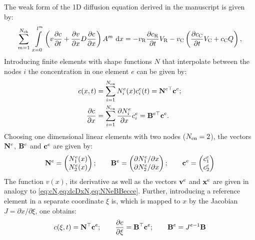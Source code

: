 \documentclass{article}
\begin{document}
  The weak form of the 1D diffusion equation derived in the manuscript is given by:
  \begin{equation}
    \sum_{m=1}^{N_{\rm ch}} \ \int\displaylimits_{x=0}^{l^m} \left( v \frac{\partial c}{\partial t} + \frac{\partial v}{\partial x} D \frac{\partial c}{\partial x} \right) A^m \ {\rm d} x= - v_{\rm R} \frac{\partial c_{\rm R}}{\partial t} V_{\rm R} - v_{\rm C} \left( \frac{\partial c_{\rm C}}{\partial t} V_{\rm C} + c_{\rm C} Q\right), 
    \label{eq:weakForm}
  \end{equation}  
  Introducing finite elements with shape functions $N$ that interpolate between the nodes $i$ the concentration in one element $e$ can be given by:
  \begin{align}
    c(x,t) &= \sum_{i=1}^{N_{\rm en}} N_i^e(x) c_i^e(t) = {{\bf{N}}}^{e \top} {\bf{c}}^e \label{eq:cN};\\
    \frac{\partial c}{\partial x} &= \sum_{i=1}^{N_{\rm en}} \frac{\partial N_i^e}{\partial x} c_i^e= {{\bf{B}}}^{e \top} {\bf{c}}^e.
    \label{eq:dcDxN}
  \end{align}
  Choosing one dimensional linear elements with two nodes ($N_{\rm en}=2$), the vectors ${\bf{N}}^e$, ${\bf{B}}^e$ and ${\bf{c}}^e$ are given by:
  \begin{equation}
    {\bf{N}}^e = \begin{pmatrix} N_1^e(x) \\ N_2^e(x) \end{pmatrix}; \qquad 
    {\bf{B}}^e = \begin{pmatrix} \partial N_1^e / \partial x \\ \partial N_2^e / \partial x \end{pmatrix}; \qquad 
    {\bf{c}}^e = \begin{pmatrix} c_1^e \\ c_2^e \end{pmatrix}
    \label{eq:NNeBBecce}
  \end{equation}
  The function $v(x)$, its derivative as well as the vectors ${\bf{v}}^e$ and ${\bf{x}}^e$ are given in analogy to \cref{eq:cN,eq:dcDxN,eq:NNeBBecce}. Further, introducing a reference element in a separate coordinate $\xi$ is, which is mapped to $x$ by the Jacobian \mbox{$J=\partial x / \partial \xi$}, one obtains:
  \begin{equation}
    c(\xi,t) = {\bf{N}}^{\top} {\bf{c}}^e; \qquad \frac{\partial c}{\partial \xi} = {\bf{B}}^{\top} {\bf{c}}^e; \qquad {\bf{B}}^e = J^{e-1} {\bf{B}}
  \end{equation}
\end{document}
